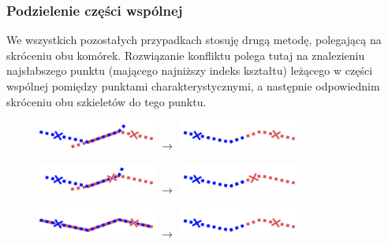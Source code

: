 \documentclass[declaration,shortabstract,mgr]{iithesis}
\begin{document}

\subsubsection{Podzielenie części wspólnej}

We wszystkich pozostałych przypadkach stosuję drugą metodę, polegającą na skróceniu obu komórek.
Rozwiązanie konfliktu polega tutaj na znalezieniu najsłabszego punktu (mającego najniższy indeks kształtu) leżącego w części wspólnej pomiędzy punktami charakterystycznymi, a następnie odpowiednim skróceniu obu szkieletów do tego punktu.

\begin{figure}[H]
  \centering
  \includegraphics[valign=m,width=0.35\textwidth]{images/overlap-out-out-split.png}
  $\rightarrow$
  \includegraphics[valign=m,width=0.35\textwidth]{images/overlap-out-out-split-solved.png}
\end{figure}

\begin{figure}[H]
  \centering
  \includegraphics[valign=m,width=0.35\textwidth]{images/overlap-out-in-split.png}
  $\rightarrow$
  \includegraphics[valign=m,width=0.35\textwidth]{images/overlap-out-in-split-solved.png}
\end{figure}

\begin{figure}[H]
  \centering
  \includegraphics[valign=m,width=0.35\textwidth]{images/overlap-in-in-split.png}
  $\rightarrow$
  \includegraphics[valign=m,width=0.35\textwidth]{images/overlap-in-in-split-solved.png}
\end{figure}
\end{document}
